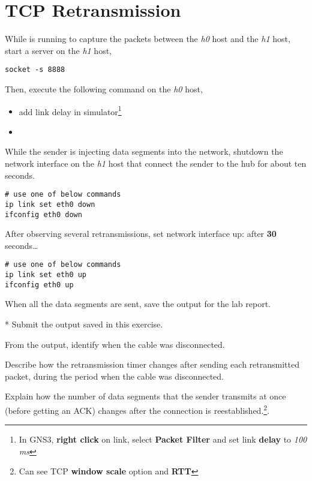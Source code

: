 \documentclass{../UTNetLab}
\begin{document}
\section{TCP Retransmission}
While  is running to capture the packets between the \textit{h0} host and the \textit{h1} host, start a  server on the \textit{h1} host,
\begin{lstlisting}
socket -s 8888
    \end{lstlisting}
Then, execute the following command on the \textit{h0} host,
\begin{itemize}
    \item add link delay in simulator\footnote{In GNS3, \textbf{right click} on link, select \textbf{Packet Filter} and set link \textbf{delay} to \textit{100 ms}}
    \item {}
\end{itemize}
While the sender is injecting data segments into the network, shutdown the network interface on the \textit{h1} host that connect the sender to the hub for about ten seconds.
\begin{lstlisting}[emph={eth0},morekeywords={[3]link,set,down}]
# use one of below commands
ip link set eth0 down
ifconfig eth0 down
    \end{lstlisting}

After observing several retransmissions, set network interface up:
after \textbf{30} seconds\ldots
\begin{lstlisting}[emph={eth0},morekeywords={[3]link,set,up}]
# use one of below commands
ip link set eth0 up
ifconfig eth0 up
    \end{lstlisting} %
When all the data segments are sent, save the  output for the lab report.

\begin{report}
    \item [*] Submit the  output saved in this exercise.

    \item From the  output, identify when the cable was disconnected.

    \item Describe how the retransmission timer changes after sending each retransmitted packet, during the period when the cable was disconnected.

    \item Explain how the number of data segments that the sender transmits at once (before getting an ACK) changes after the connection is reestablished.\footnote{Can see TCP \textbf{window scale} option and \textbf{RTT}}.
\end{report}
\end{document}
